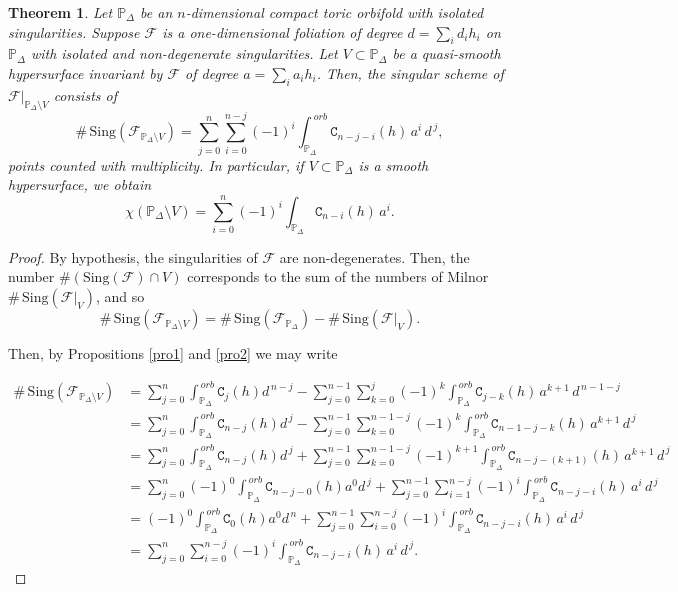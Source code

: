 \documentclass[11pt]{amsart}
\theoremstyle{plain}
\newtheorem{teo}{Theorem}[section]
\theoremstyle{definition}
\begin{document}
\begin{teo} \label{aa} Let $\mathbb{P}_{\Delta}$ be an $n$-dimensional compact toric orbifold with isolated singularities.
Suppose $\mathcal{F}$ is a one-dimensional foliation of degree $d=\sum_{i}d_{i} h_i$ on $\mathbb{P}_{\Delta}$
with isolated and non-degenerate singularities. 
Let $V \subset \mathbb{P}_{\Delta}$ be a quasi-smooth hypersurface invariant by $\mathcal{F}$ of degree $a=\sum_{i}a_{i} h_i$. Then,
the singular scheme of $\mathcal{F}|_{\mathbb{P}_{\Delta}\setminus V}$ consists of
$$\#\,\mathrm{Sing}(\mathcal{F}_{\mathbb{P}_{\Delta}\setminus V})
=\sum_{j=0}^{n}\sum_{i=0}^{n-j}(-1)^{i}\int_{\mathbb{P}_{\Delta}}^{\,orb}\texttt{C}_{n-j-i}(h)\,a^{i}\,d^{\,j},$$
points counted with multiplicity. In particular, if 
$V \subset \mathbb{P}_{\Delta}$ is a smooth hypersurface, we obtain 
$$\chi(\mathbb{P}_{\Delta}\setminus V)=\sum_{i=0}^n(-1)^{i}\int_{\mathbb{P}_{\Delta}}\texttt{C}_{n-i}(h)\,a^{i}.$$
\end{teo}

\begin{proof} By hypothesis, the singularities of $\mathcal{F}$ are non-degenerates. Then, the number 
$\#\left(\mathrm{Sing}(\mathcal{F})\cap V\right)$
corresponds to the sum of the numbers of Milnor $\#\,\mathrm{Sing}(\mathcal{F}|_V)$, and so 
$$\#\,\mathrm{Sing}(\mathcal{F}_{\mathbb{P}_{\Delta}\setminus V})=
\#\,\mathrm{Sing}(\mathcal{F}_{\mathbb{P}_{\Delta}})-
\#\,\mathrm{Sing}(\mathcal{F}|_{V}).$$

\noindent Then, by Propositions \ref{pro1} and \ref{pro2} we may write 

\begin{align*}
\#\,\mathrm{Sing}(\mathcal{F}_{\mathbb{P}_{\Delta}\setminus V})
&=\sum_{j=0}^{n}\int_{\mathbb{P}_{\Delta}}^{\,orb}\texttt{C}_j(h)d^{\,n-j}
-\sum_{j=0}^{n-1}\sum_{k=0}^{j}(-1)^{k}\int_{\mathbb{P}_{\Delta}}^{\,orb}\texttt{C}_{j-k}(h)\,a^{k+1}\,d^{\,n-1-j}\\
&=\sum_{j=0}^{n}\int_{\mathbb{P}_{\Delta}}^{\,orb}\texttt{C}_{n-j}(h)d^{\,j}
-\sum_{j=0}^{n-1}\sum_{k=0}^{n-1-j}(-1)^{k}\int_{\mathbb{P}_{\Delta}}^{\,orb}\texttt{C}_{n-1-j-k}(h)\,a^{k+1}\,d^{\,j}\\
&=\sum_{j=0}^{n}\int_{\mathbb{P}_{\Delta}}^{\,orb}\texttt{C}_{n-j}(h)d^{\,j}
+\sum_{j=0}^{n-1}\sum_{k=0}^{n-1-j}(-1)^{k+1}\int_{\mathbb{P}_{\Delta}}^{\,orb}\texttt{C}_{n-j-(k+1)}(h)\,a^{k+1}\,d^{\,j}\\
&=\sum_{j=0}^{n}(-1)^0\int_{\mathbb{P}_{\Delta}}^{\,orb}\texttt{C}_{n-j-0}(h)a^0d^{\,j}
+\sum_{j=0}^{n-1}\sum_{i=1}^{n-j}(-1)^{i}\int_{\mathbb{P}_{\Delta}}^{\,orb}\texttt{C}_{n-j-i}(h)\,a^{i}\,d^{\,j}\\
&=(-1)^0\int_{\mathbb{P}_{\Delta}}^{\,orb}\texttt{C}_{0}(h)a^0d^{\,n}
+\sum_{j=0}^{n-1}\sum_{i=0}^{n-j}(-1)^{i}\int_{\mathbb{P}_{\Delta}}^{\,orb}\texttt{C}_{n-j-i}(h)\,a^{i}\,d^{\,j}\\
&=\sum_{j=0}^{n}\sum_{i=0}^{n-j}(-1)^{i}\int_{\mathbb{P}_{\Delta}}^{\,orb}\texttt{C}_{n-j-i}(h)\,a^{i}\,d^{\,j}.
\end{align*}
\end{proof}
\end{document}
